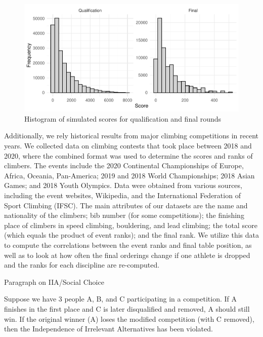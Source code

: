 \documentclass[12pt]{article}
\begin{document}
\begin{figure}[H]

{\centering \includegraphics{draft_files/figure-latex/unnamed-chunk-5-1} 

}

\caption{Histogram of simulated scores for qualification and final rounds}\label{fig:unnamed-chunk-5}
\end{figure}

Additionally, we rely historical results from major climbing
competitions in recent years. We collected data on climbing contests
that took place between 2018 and 2020, where the combined format was
used to determine the scores and ranks of climbers. The events include
the 2020 Continental Championships of Europe, Africa, Oceania,
Pan-America; 2019 and 2018 World Championships; 2018 Asian Games; and
2018 Youth Olympics. Data were obtained from various sources, including
the event websites, Wikipedia, and the International Federation of Sport
Climbing (IFSC). The main attributes of our datasets are the name and
nationality of the climbers; bib number (for some competitions); the
finishing place of climbers in speed climbing, bouldering, and lead
climbing; the total score (which equals the product of event ranks); and
the final rank. We utilize this data to compute the correlations between
the event ranks and final table position, as well as to look at how
often the final orderings change if one athlete is dropped and the ranks
for each discipline are re-computed.

Paragraph on IIA/Social Choice

Suppose we have 3 people A, B, and C participating in a competition. If
A finishes in the first place and C is later disqualified and removed, A
should still win. If the original winner (A) loses the modified
competition (with C removed), then the Independence of Irrelevant
Alternatives has been violated.
\end{document}
